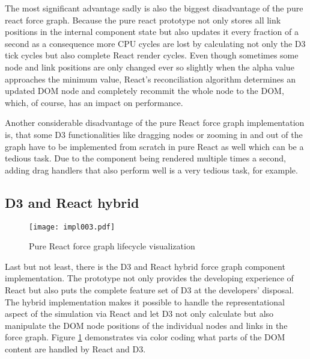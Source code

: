 The most significant advantage sadly is also the biggest disadvantage of the pure react force graph. Because the pure react prototype not only stores all link positions in the internal component state but also updates it every fraction of a second as a consequence more CPU cycles are lost by calculating not only the D3 tick cycles but also complete React render cycles. Even though sometimes some node and link positions are only changed ever so slightly when the alpha value approaches the minimum value, React's reconciliation algorithm determines an updated DOM node and completely recommit the whole node to the DOM, which, of course, has an impact on performance.

Another considerable disadvantage of the pure React force graph implementation is, that some D3 functionalities like dragging nodes or zooming in and out of the graph have to be implemented from scratch in pure React as well which can be a tedious task. Due to the component being rendered multiple times a second, adding drag handlers that also perform well is a very tedious task, for example. 


\subsection{D3 and React hybrid}
\label{sub:D3AndReactHybrid}

\begin{figure}
\centering
\texttt{[image: impl003.pdf]}
\caption{Pure React force graph lifecycle visualization}
\label{fig:reactD3HybridLifeCycle}
\end{figure}

Last but not least, there is the D3 and React hybrid force graph component implementation. The prototype not only provides the developing experience of React but also puts the complete feature set of D3 at the developers' disposal. The hybrid implementation makes it possible to handle the representational aspect of the simulation via React and let D3 not only calculate but also manipulate the DOM node positions of the individual nodes and links in the force graph. Figure \ref{fig:reactD3HybridLifeCycle} demonstrates via color coding what parts of the DOM content are handled by React and D3. 


